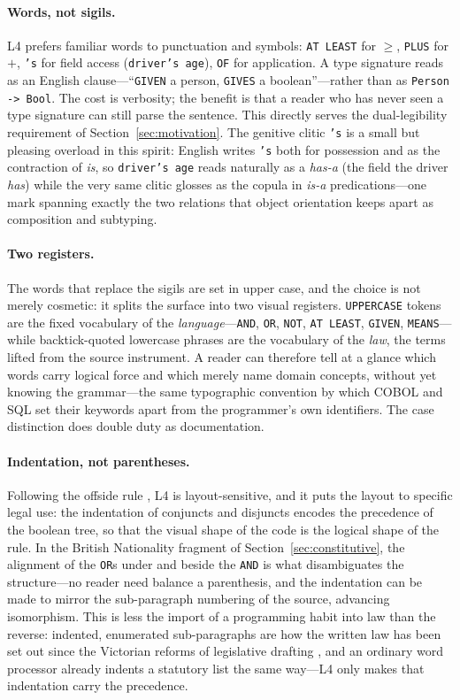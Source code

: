 \documentclass[sigconf,nonacm]{acmart}
\newcommand{\bq}{\char96\relax}            %
\newcommand{\code}[1]{\texttt{\small #1}}
\begin{document}
\paragraph{Words, not sigils.}
L4 prefers familiar words to punctuation and symbols: \code{AT LEAST} for
$\geq$, \code{PLUS} for $+$, \code{'s} for field access (\code{driver's
age}), \code{OF} for application. A type signature reads as an English
clause---``\code{GIVEN} a person, \code{GIVES} a boolean''---rather than as
\code{Person -> Bool}. The cost is verbosity; the benefit is that a reader
who has never seen a type signature can still parse the sentence. This
directly serves the dual-legibility requirement of
Section~\ref{sec:motivation}. The genitive clitic \code{'s} is a small but
pleasing overload in this spirit: English writes \code{'s} both for
possession and as the contraction of \emph{is}, so \code{driver's age} reads
naturally as a \emph{has-a} (the field the driver \emph{has}) while the very
same clitic glosses as the copula in \emph{is-a} predications---one mark
spanning exactly the two relations that object orientation keeps apart as
composition and subtyping.

\paragraph{Two registers.}
The words that replace the sigils are set in upper case, and the choice is not
merely cosmetic: it splits the surface into two visual registers. \code{UPPERCASE}
tokens are the fixed vocabulary of the \emph{language}---\code{AND}, \code{OR},
\code{NOT}, \code{AT LEAST}, \code{GIVEN}, \code{MEANS}---while
\bq backtick-quoted lowercase phrases\bq{} are the vocabulary of the \emph{law},
the terms lifted from the source instrument. A reader can therefore tell at a
glance which words carry logical force and which merely name domain concepts,
without yet knowing the grammar---the same typographic convention by which COBOL
and SQL set their keywords apart from the programmer's own identifiers. The case
distinction does double duty as documentation.

\paragraph{Indentation, not parentheses.}
Following the offside rule \cite{landin1966next700}, L4 is
layout-sensitive, and it puts the layout to specific legal use: the
indentation of conjuncts and disjuncts encodes the precedence of the
boolean tree, so that the visual shape of the code is the logical shape of
the rule. In the British Nationality fragment of
Section~\ref{sec:constitutive}, the alignment of the \code{OR}s under and
beside the \code{AND} is what disambiguates the structure---no reader need
balance a parenthesis, and the indentation can be made to mirror the
sub-paragraph numbering of the source, advancing isomorphism. This is less the
import of a programming habit into law than the reverse: indented, enumerated
sub-paragraphs are how the written law has been set out since the Victorian
reforms of legislative drafting \cite{coode1843}, and an ordinary word processor
already indents a statutory list the same way---L4 only makes that indentation
carry the precedence.
\end{document}
